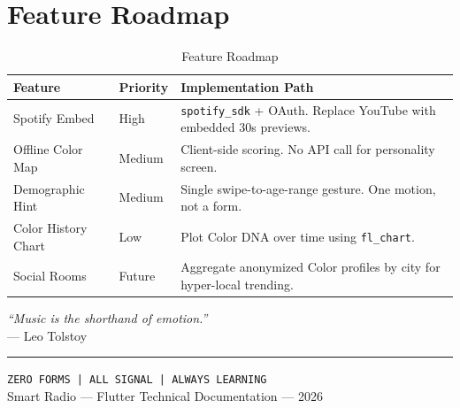 \documentclass[12pt, a4paper]{report}
\newcommand{\pkg}[1]{\texttt{\color{codeblue}#1}}
\begin{document}
\section{Feature Roadmap}

\begin{table}[H]
\centering
\renewcommand{\arraystretch}{1.5}
\begin{tabularx}{\linewidth}{@{}l l X@{}}
  \toprule
  \rowcolor{codebg}
  \textbf{\color{cyancol}Feature} & \textbf{\color{cyancol}Priority} &
  \textbf{\color{cyancol}Implementation Path} \\
  \midrule
  Spotify Embed & High &
    \pkg{spotify\_sdk} + OAuth. Replace YouTube with embedded 30s previews. \\
  Offline Color Map & Medium &
    Client-side scoring. No API call for personality screen. \\
  Demographic Hint & Medium &
    Single swipe-to-age-range gesture. One motion, not a form. \\
  Color History Chart & Low &
    Plot Color DNA over time using \pkg{fl\_chart}. \\
  Social Rooms & Future &
    Aggregate anonymized Color profiles by city for hyper-local trending. \\
  \bottomrule
\end{tabularx}
\caption{Feature Roadmap}
\end{table}

\newpage
\thispagestyle{empty}
\begin{center}
\vspace*{4cm}

\vspace{1.5cm}
{\color{softwhite}\large\itshape
``Music is the shorthand of emotion.''}\\[4pt]
{\color{dimwhite}\small --- Leo Tolstoy}

\vspace{2cm}
{\color{sectionline}\rule{0.4\linewidth}{2pt}}
\vspace{1cm}

{\color{softwhite}\small\texttt{ZERO FORMS | ALL SIGNAL | ALWAYS LEARNING}}\\[6pt]
{\color{dimwhite}\footnotesize Smart Radio --- Flutter Technical Documentation --- 2026}
\end{center}
\end{document}
